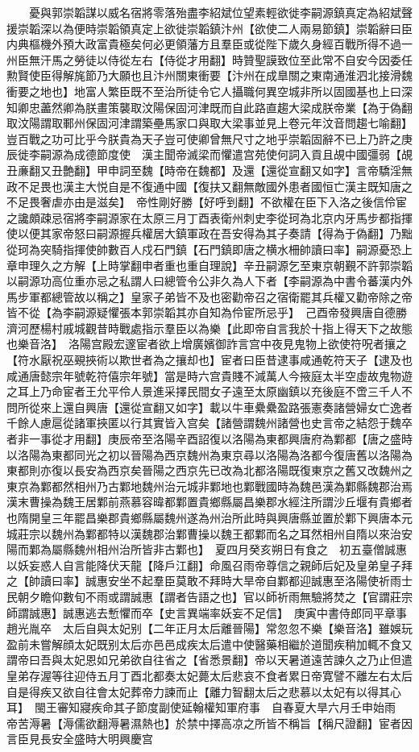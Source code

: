 　　憂與郭崇韜謀以威名宿將零落殆盡李紹斌位望素輕欲徙李嗣源鎮真定為紹斌聲援崇韜深以為便時崇韜領真定上欲徙崇韜鎮汴州【欲使二人兩易節鎮】崇韜辭曰臣内典樞機外預大政富貴極矣何必更領藩方且羣臣或從陛下歲久身經百戰所得不過一州臣無汗馬之勞徒以侍從左右【侍從才用翻】時贊聖謨致位至此常不自安今因委任勲賢使臣得解旄節乃大願也且汴州關東衝要【汴州在成臯關之東南通淮泗北接滑魏衝要之地也】地富人繁臣既不至治所徒令它人攝職何異空城非所以固國基也上曰深知卿忠藎然卿為朕畫策襲取汶陽保固河津既而自此路直趨大梁成朕帝業【為于偽翻取汶陽謂取鄆州保固河津謂築壘馬家口與取大梁事並見上卷元年汶音問趨七喻翻】豈百戰之功可比乎今朕貴為天子豈可使卿曾無尺寸之地乎崇韜固辭不已上乃許之庚辰徙李嗣源為成德節度使　漢主聞帝滅梁而懼遣宫苑使何詞入貢且覘中國彊弱【覘丑亷翻又丑艶翻】甲申詞至魏【時帝在魏都】及還【還從宣翻又如字】言帝驕淫無政不足畏也漢主大悦自是不復通中國【復扶又翻無敵國外患者國恒亡漢主既知唐之不足畏奢虐亦由是滋矣】　帝性剛好勝【好呼到翻】不欲權在臣下入洛之後信伶宦之讒頗疎忌宿將李嗣源家在太原三月丁酉表衛州刺史李從珂為北京内牙馬步都指揮使以便其家帝怒曰嗣源握兵權居大鎮軍政在吾安得為其子奏請【得為于偽翻】乃黜從珂為突騎指揮使帥數百人戍石門鎮【石門鎮即唐之横水柵帥讀曰率】嗣源憂恐上章申理久之方解【上時掌翻申者重也重自理說】辛丑嗣源乞至東京朝覲不許郭崇韜以嗣源功高位重亦忌之私謂人曰總管令公非久為人下者【李嗣源為中書令蕃漢内外馬步軍都總管故以稱之】皇家子弟皆不及也密勸帝召之宿衛罷其兵權又勸帝除之帝皆不從【為李嗣源疑懼張本郭崇韜其亦自知為伶宦所忌乎】　己酉帝發興唐自德勝濟河歷楊村戚城觀昔時戰處指示羣臣以為樂【此即帝自言我於十指上得天下之故態也樂音洛】　洛陽宫殿宏邃宦者欲上增廣嬪御詐言宫中夜見鬼物上欲使符呪者攘之【符水厭祝巫覡挾術以欺世者為之攘却也】宦者曰臣昔逮事咸通乾符天子【逮及也咸通唐懿宗年號乾符僖宗年號】當是時六宫貴賤不減萬人今掖庭太半空虛故鬼物遊之耳上乃命宦者王允平伶人景進采擇民間女子遠至太原幽鎮以充後庭不啻三千人不問所從來上還自興唐【還從宣翻又如字】載以牛車纍纍盈路張憲奏諸營婦女亡逸者千餘人慮扈從諸軍挾匿以行其實皆入宫矣【諸營謂魏州諸營也史言帝之結怨于魏卒者非一事從才用翻】庚辰帝至洛陽辛酉詔復以洛陽為東都興唐府為鄴都【唐之盛時以洛陽為東都同光之初以晉陽為西京魏州為東京尋以洛陽為洛都今復唐舊以洛陽為東都則亦復以長安為西京矣晉陽之西京先已改為北都洛陽既復東京之舊又改魏州之東京為鄴都然相州乃古鄴地魏州治元城非鄴地也鄴戰國時為魏邑漢為鄴縣魏郡治焉漢末曹操為魏王居鄴前燕慕容暐都鄴置貴鄉縣屬昌樂郡水經注所謂沙丘堰有貴鄉者也隋開皇三年罷昌樂郡貴鄉縣屬魏州遂為州治所此時與興唐縣並置於鄴下興唐本元城莊宗以魏州為鄴都特以漢魏郡治鄴曹操以魏王都鄴而名之耳然相州自隋以來治安陽而鄴為屬縣魏州相州治所皆非古鄴也】　夏四月癸亥朔日有食之　初五臺僧誠惠以妖妄惑人自言能降伏天龍【降戶江翻】命風召雨帝尊信之親師后妃及皇弟皇子拜之【帥讀曰率】誠惠安坐不起羣臣莫敢不拜時大旱帝自鄴都迎誠惠至洛陽使祈雨士民朝夕瞻仰數旬不雨或謂誠惠【謂者告語之也】官以師祈雨無驗將焚之【官謂莊宗師謂誠惠】誠惠逃去慙懼而卒【史言異端率妖妄不足信】　庚寅中書侍郎同平章事趙光胤卒　太后自與太妃别【二年正月太后離晉陽】常忽忽不樂【樂音洛】雖娛玩盈前未嘗解顔太妃既别太后亦邑邑成疾太后遣中使醫藥相繼於道聞疾稍加輒不食又謂帝曰吾與太妃恩如兄弟欲自往省之【省悉景翻】帝以天暑道遠苦諫久之乃止但遣皇弟存渥等往迎侍五月丁酉北都奏太妃薨太后悲哀不食者累日帝寛譬不離左右太后自是得疾又欲自往會太妃葬帝力諫而止【離力智翻太后之悲慕以太妃有以得其心耳】　閩王審知寢疾命其子節度副使延翰權知軍府事　自春夏大旱六月壬申始雨　帝苦溽暑【溽儒欲翻溽暑濕熱也】於禁中擇高凉之所皆不稱旨【稱尺證翻】宦者因言臣見長安全盛時大明興慶宫
